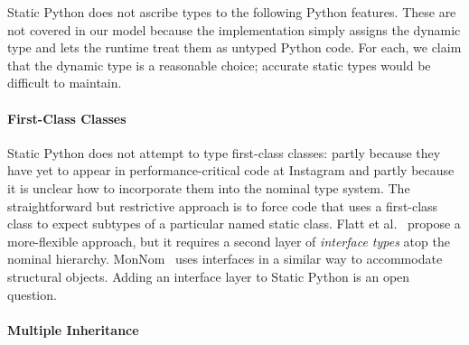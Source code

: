 \documentclass[english,cleveref,submission]{programming}
\newcommand{\SP}{Static Python}
\begin{document}

\SP{} does not ascribe types to the following Python features.
These are not covered in our model because the implementation simply
assigns the dynamic type and lets the runtime treat them as untyped
Python code.
For each, we claim that the dynamic type is a reasonable choice;
accurate static types would be difficult to maintain.


\paragraph{First-Class Classes}

\SP{} does not attempt to type first-class classes: partly because they have
yet to appear in performance-critical code at Instagram and partly because it
is unclear how to incorporate them into the nominal type system.
The straightforward but restrictive approach is to force code that uses a
first-class class to expect subtypes of a particular named static class.
Flatt et al.~\cite{fkf-popl-1998} propose a more-flexible approach, %
but it requires a second layer of \emph{interface types} atop the nominal hierarchy.
MonNom~\cite{mt-oopsla-2021} uses interfaces in a similar way to accommodate
structural objects.
Adding an interface layer to \SP{} is an open question.




\paragraph{Multiple Inheritance}

\end{document}
